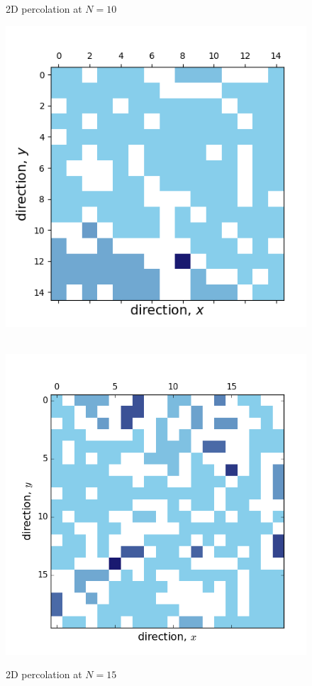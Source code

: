 \documentclass[12pt]{article}
\begin{document}
\begin{figure}[!htb]
\caption{2D percolation at $N=10$}\label{fig:N2}
\endminipage\hfill
{}
\includegraphics[width=\linewidth]{percolation15.png}
\caption{2D percolation at $N=15$}\label{fig:N3}
\endminipage\hfill \\
  \includegraphics[width=\linewidth]{percolation20.png}

\end{figure}
\end{document}
